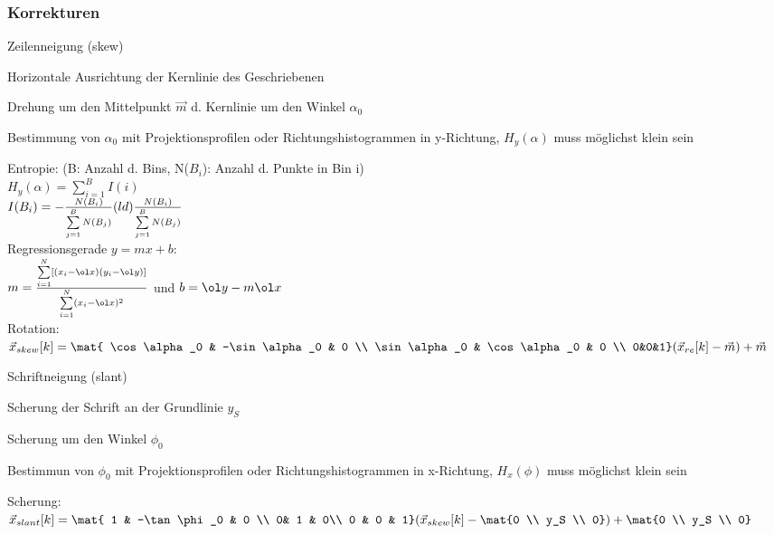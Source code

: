 \documentclass[german,color,6pt]{latex4ei/latex4ei_sheet}
\begin{document}
\begin{sectionbox}
	\subsubsection{Korrekturen}
		\begin{cookbox}{Zeilenneigung (skew)}
			\item Horizontale Ausrichtung der Kernlinie des Geschriebenen
			\item Drehung um den Mittelpunkt $\vec m$ d. Kernlinie um den Winkel $\alpha_0$
			\item Bestimmung von $\alpha_0$ mit Projektionsprofilen oder Richtungshistogrammen in y-Richtung, $H_y(\alpha)$ muss möglichst klein sein
		\end{cookbox}

		Entropie: (B: Anzahl d. Bins, N($B_i$): Anzahl d. Punkte in Bin i)\\
		$H_y(\alpha) = \sum\limits_{i=1}^{B}I(i)$\\
		$I(B_i) = - \frac{N(B_i)}{\sum\limits_{j=1}^{B} N(B_j)} \text(ld) \frac{N(B_i)}{\sum\limits_{j=1}^{B} N(B_j)}$\\
		Regressionsgerade $y = mx+b$:\\
		$m=\frac{\sum \limits_{i=1}^{N}[(x_i - \ol x) (y_i - \ol y)]}{\sum \limits_{i=1}^{N} (x_i - \ol x)^2}$ und $b= \ol y - m \ol x$\\
		Rotation:\\
		$\vec x_{skew}[k] = \mat{ \cos \alpha_0 & -\sin \alpha_0 & 0 \\ \sin \alpha_0 & \cos \alpha_0 & 0 \\ 0&0&1} (\vec x_{re}[k] - \vec m)+ \vec m$\\


		\begin{cookbox}{Schriftneigung (slant)}
			\item Scherung der Schrift an der Grundlinie $y_S$
			\item Scherung um den Winkel $\phi_0$
			\item Bestimmun von  $\phi_0$ mit  Projektionsprofilen oder Richtungshistogrammen in x-Richtung, $H_x(\phi)$ muss möglichst klein sein
		\end{cookbox}

		Scherung:\\
		$\vec x_{slant}[k] = \mat{ 1 & -\tan\phi_0 & 0 \\ 0& 1 & 0\\ 0 & 0 & 1} (\vec x_{skew}[k]- \mat{0 \\ y_S \\ 0})+ \mat{0 \\ y_S \\ 0}$ \\
\end{sectionbox}
\end{document}
